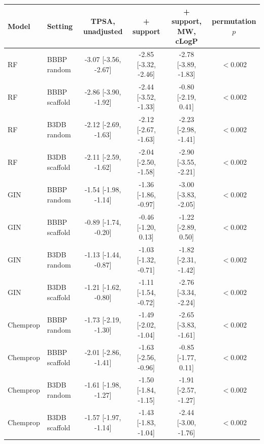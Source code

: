 \begin{tabular}{llcccc}
\toprule
Model & Setting & TPSA, unadjusted & + support & + support, MW, cLogP & permutation $p$\\
\midrule
RF & BBBP random & -3.07 [-3.56, -2.67] & -2.85 [-3.32, -2.46] & -2.78 [-3.89, -1.83] & $<$0.002\\
RF & BBBP scaffold & -2.86 [-3.90, -1.92] & -2.44 [-3.52, -1.33] & -0.80 [-2.19, 0.41] & $<$0.002\\
RF & B3DB random & -2.12 [-2.69, -1.63] & -2.12 [-2.67, -1.63] & -2.23 [-2.98, -1.41] & $<$0.002\\
RF & B3DB scaffold & -2.11 [-2.59, -1.62] & -2.04 [-2.50, -1.58] & -2.90 [-3.55, -2.21] & $<$0.002\\
GIN & BBBP random & -1.54 [-1.98, -1.14] & -1.36 [-1.86, -0.97] & -3.00 [-3.83, -2.05] & $<$0.002\\
GIN & BBBP scaffold & -0.89 [-1.74, -0.20] & -0.46 [-1.20, 0.13] & -1.22 [-2.89, 0.50] & $<$0.002\\
GIN & B3DB random & -1.13 [-1.44, -0.87] & -1.03 [-1.32, -0.71] & -1.82 [-2.31, -1.42] & $<$0.002\\
GIN & B3DB scaffold & -1.21 [-1.62, -0.80] & -1.11 [-1.54, -0.72] & -2.76 [-3.34, -2.24] & $<$0.002\\
Chemprop & BBBP random & -1.73 [-2.19, -1.30] & -1.49 [-2.02, -1.04] & -2.65 [-3.83, -1.61] & $<$0.002\\
Chemprop & BBBP scaffold & -2.01 [-2.86, -1.41] & -1.63 [-2.56, -0.96] & -0.85 [-1.77, 0.11] & $<$0.002\\
Chemprop & B3DB random & -1.61 [-1.98, -1.27] & -1.50 [-1.84, -1.15] & -1.91 [-2.57, -1.27] & $<$0.002\\
Chemprop & B3DB scaffold & -1.57 [-1.97, -1.14] & -1.43 [-1.83, -1.04] & -2.44 [-3.00, -1.76] & $<$0.002\\
\bottomrule
\end{tabular}
